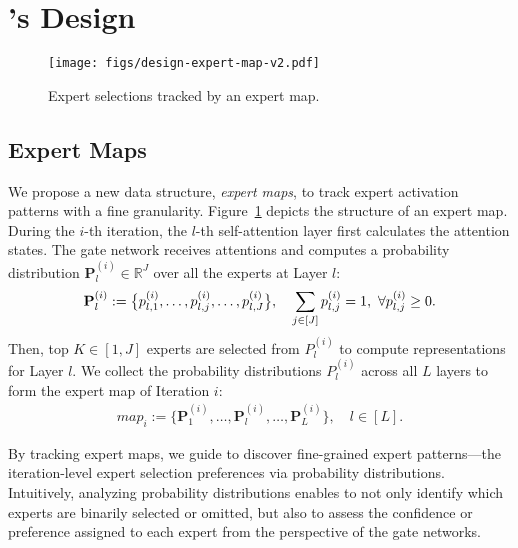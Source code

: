 \section{\sys's Design}


\begin{figure}[t]
  \centering
  \texttt{[image: figs/design-expert-map-v2.pdf]}
  \vspace{-0.15in}
  \caption{Expert selections tracked by an expert map.}
  \vspace{-0.1in}
  \label{fig:design-expert-map.pdf}
\end{figure}


\subsection{Expert Maps}
\label{subsec:design-expert-map}

We propose a new data structure, \textit{expert maps}, to track expert activation patterns with a fine granularity.
%
Figure~\ref{fig:design-expert-map.pdf} depicts the structure of an expert map. 
During the $i$-th iteration, the $l$-th self-attention layer first calculates the attention states. 
The gate network receives attentions and computes a probability distribution $\mathbf{P}^{(i)}_l \in \mathbb{R}^{J}$ over all the experts at Layer $l$:
%
\begin{align*}
    \mathbf{P}^{(i)}_l := \big{\{}p^{(i)}_{l,1}, \ldots, p^{(i)}_{l,j}, \ldots, p^{(i)}_{l,J}\big{\}}, \quad \sum_{j \in [J]} p^{(i)}_{l,j} = 1, ~\forall p^{(i)}_{l,j} \geq 0.
\end{align*}
Then, top $K \in [1, J]$ experts are selected from $P^{(i)}_l$ to compute representations for Layer $l$.
We collect the probability distributions $P^{(i)}_l$ across all $L$ layers to form the expert map of Iteration $i$:
%
\begin{align*}
    \textit{map}_i := \{\mathbf{P}^{(i)}_1, \ldots, \mathbf{P}^{(i)}_l, \ldots, \mathbf{P}^{(i)}_{L}\}, \quad l \in [L].
\end{align*} 
% 

By tracking expert maps, we guide \sys to discover fine-grained expert patterns---the iteration-level expert selection preferences via probability distributions. 
% 
Intuitively, analyzing probability distributions enables \sys to not only identify which experts are binarily selected or omitted, but also to assess the confidence or preference assigned to each expert from the perspective of the gate networks.

